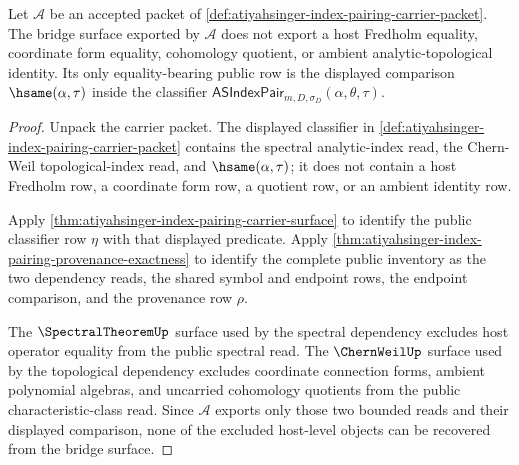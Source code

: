 \begin{theorem}
\label{thm:atiyahsinger-index-pairing-host-exclusion}
Let $\mathcal{A}$ be an accepted packet of
\autoref{def:atiyahsinger-index-pairing-carrier-packet}. The bridge surface
exported by $\mathcal{A}$ does not export a host Fredholm equality, coordinate
form equality, cohomology quotient, or ambient analytic-topological identity.
Its only equality-bearing public row is the displayed comparison
$\hsame(\alpha,\tau)$ inside the classifier
$\mathsf{ASIndexPair}_{m,D,\sigma_D}(\alpha,\theta,\tau)$.
\end{theorem}
\begin{proof}
Unpack the carrier packet. The displayed classifier in
\autoref{def:atiyahsinger-index-pairing-carrier-packet} contains the spectral
analytic-index read, the Chern-Weil topological-index read, and
$\hsame(\alpha,\tau)$; it does not contain a host Fredholm row, a coordinate
form row, a quotient row, or an ambient identity row.

Apply \autoref{thm:atiyahsinger-index-pairing-carrier-surface} to identify the
public classifier row $\eta$ with that displayed predicate. Apply
\autoref{thm:atiyahsinger-index-pairing-provenance-exactness} to identify the
complete public inventory as the two dependency reads, the shared symbol and
endpoint rows, the endpoint comparison, and the provenance row $\rho$.

The $\SpectralTheoremUp$ surface used by the spectral dependency excludes host
operator equality from the public spectral read. The $\ChernWeilUp$ surface
used by the topological dependency excludes coordinate connection forms,
ambient polynomial algebras, and uncarried cohomology quotients from the
public characteristic-class read. Since $\mathcal{A}$ exports only those two
bounded reads and their displayed comparison, none of the excluded host-level
objects can be recovered from the bridge surface.
\end{proof}


